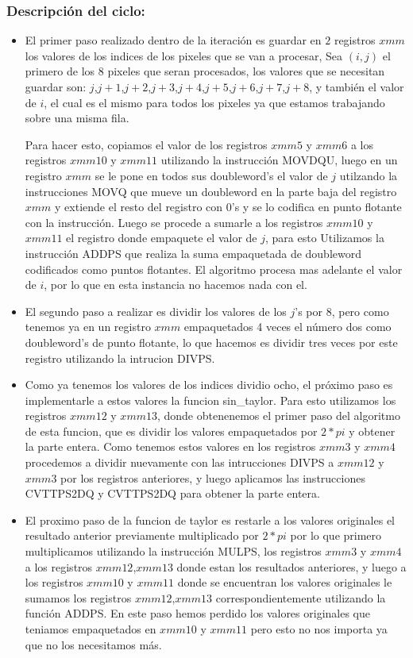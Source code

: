 \subsubsection{Descripción del ciclo:}
\begin{itemize}
	\item El primer paso realizado dentro de la iteración es guardar en $2$ registros $xmm$ los valores de los indices de los pixeles que se van a procesar, Sea $(i,j)$ el primero de los $8$ pixeles que seran procesados, los valores que se necesitan guardar son: $j$,$j+1$,$j+2$,$j+3$,$j+4$,$j+5$,$j+6$,$j+7$,$j+8$, y también el valor de $i$, el cual es el mismo para todos los pixeles ya que estamos trabajando sobre una misma fila.
	
	Para hacer esto, copiamos el valor de los registros $xmm5$ y $xmm6$ a los registros $xmm10$ y $xmm11$ utilizando la instrucción MOVDQU, luego en un registro $xmm$ se le pone en todos sus doubleword's el valor de $j$ utilzando la instrucciones MOVQ que mueve un doubleword en la parte baja del registro $xmm$ y extiende el resto del registro con $0$'s y se lo codifica en punto flotante con la instrucción. Luego se procede a sumarle a los registros $xmm10$ y $xmm11$ el registro donde empaquete el valor de $j$, para esto Utilizamos la instrucción ADDPS que realiza la suma empaquetada de doubleword codificados como puntos flotantes.
	El algoritmo procesa mas adelante el valor de $i$, por lo que en esta instancia no hacemos nada con el.

	\item El segundo paso a realizar es dividir los valores de los $j$'s por 8, pero como tenemos ya en un registro $xmm$ empaquetados 4 veces el número dos como doubleword's de punto flotante, lo que hacemos es dividir tres veces por este registro utilizando la intrucion DIVPS.

	\item  Como ya tenemos los valores de los indices dividio ocho, el próximo paso es implementarle a estos valores la funcion sin_taylor. Para esto utilizamos los registros $xmm12$ y $xmm13$, donde obtenenemos el primer paso del algoritmo de esta funcion, que es dividir los valores empaquetados por $2*pi$ y obtener la parte entera. Como tenemos estos valores en los registros $xmm3$ y $xmm4$ procedemos a dividir nuevamente con las intrucciones DIVPS a $xmm12$ y $xmm3$ por los registros anteriores, y luego aplicamos las instrucciones CVTTPS2DQ y CVTTPS2DQ para obtener la parte entera.

	\item El proximo paso de la funcion de taylor es restarle a los valores originales el resultado anterior previamente multiplicado por $2*pi$ por lo que primero multiplicamos utilizando la instrucción MULPS, los registros $xmm3$ y $xmm4$ a los registros $xmm12$,$xmm13$ donde estan los resultados anteriores, y luego a los registros $xmm10$ y $xmm11$ donde se encuentran los valores originales le sumamos los registros $xmm12$,$xmm13$ correspondientemente utilizando la función ADDPS.
	En este paso hemos perdido los valores originales que teniamos empaquetados en $xmm10$ y $xmm11$ pero esto no nos importa ya que no los necesitamos más.


\end{itemize}
